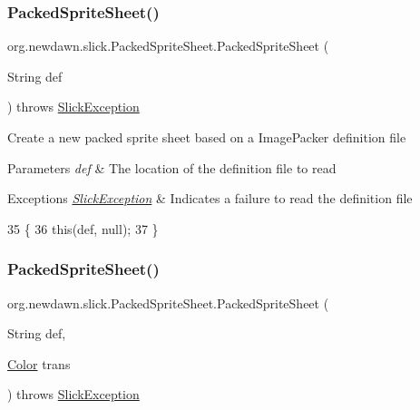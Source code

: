 \subsubsection{\texorpdfstring{Packed\+Sprite\+Sheet()}{PackedSpriteSheet()}\hspace{0.1cm}{\footnotesize\ttfamily [1/4]}}
{\footnotesize\ttfamily org.\+newdawn.\+slick.\+Packed\+Sprite\+Sheet.\+Packed\+Sprite\+Sheet (\begin{DoxyParamCaption}\item[{String}]{def }\end{DoxyParamCaption}) throws \mbox{\hyperlink{classorg_1_1newdawn_1_1slick_1_1_slick_exception}{Slick\+Exception}}\hspace{0.3cm}{\ttfamily [inline]}}

Create a new packed sprite sheet based on a Image\+Packer definition file


\begin{DoxyParams}{Parameters}
{\em def} & The location of the definition file to read \\
\hline
\end{DoxyParams}

\begin{DoxyExceptions}{Exceptions}
{\em \mbox{\hyperlink{classorg_1_1newdawn_1_1slick_1_1_slick_exception}{Slick\+Exception}}} & Indicates a failure to read the definition file \\
\hline
\end{DoxyExceptions}

\begin{DoxyCode}
35                                                                \{
36         \textcolor{keyword}{this}(def, null);
37     \}
\end{DoxyCode}
\mbox{\label{classorg_1_1newdawn_1_1slick_1_1_packed_sprite_sheet_a23c64c2515b40bfee62d5b12b6dd36df}} 
\subsubsection{\texorpdfstring{Packed\+Sprite\+Sheet()}{PackedSpriteSheet()}\hspace{0.1cm}{\footnotesize\ttfamily [2/4]}}
{\footnotesize\ttfamily org.\+newdawn.\+slick.\+Packed\+Sprite\+Sheet.\+Packed\+Sprite\+Sheet (\begin{DoxyParamCaption}\item[{String}]{def,  }\item[{\mbox{\hyperlink{classorg_1_1newdawn_1_1slick_1_1_color}{Color}}}]{trans }\end{DoxyParamCaption}) throws \mbox{\hyperlink{classorg_1_1newdawn_1_1slick_1_1_slick_exception}{Slick\+Exception}}\hspace{0.3cm}{\ttfamily [inline]}}

